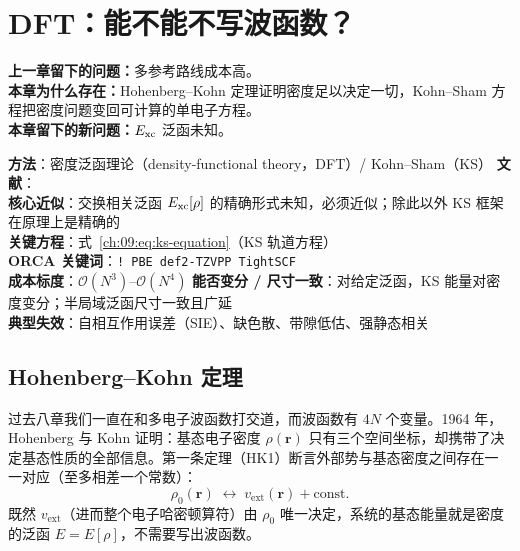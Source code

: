 
\section{DFT：能不能不写波函数？}
\label{ch:09:sec:title}

\begin{problemchain}
\textbf{上一章留下的问题：}多参考路线成本高。\\
\textbf{本章为什么存在：}Hohenberg--Kohn 定理证明密度足以决定一切，Kohn--Sham 方程把密度问题变回可计算的单电子方程。\\
\textbf{本章留下的新问题：}$E_{\mathrm{xc}}$ 泛函未知。
\end{problemchain}

\begin{methodcard}
\textbf{方法}：密度泛函理论（density-functional theory，DFT）/ Kohn--Sham（KS）\quad
\textbf{文献}：\citep{hohenberg1964,kohn1965,parr1989}\\
\textbf{核心近似}：交换相关泛函 $E_{\mathrm{xc}}[\rho]$ 的精确形式未知，必须近似；除此以外 KS 框架在原理上是精确的\\
\textbf{关键方程}：式~\eqref{ch:09:eq:ks-equation}（KS 轨道方程）\\
\textbf{ORCA 关键词}：\texttt{! PBE def2-TZVPP TightSCF}\\
\textbf{成本标度}：$\mathcal{O}(N^3)$–$\mathcal{O}(N^4)$ \quad
\textbf{能否变分 / 尺寸一致}：对给定泛函，KS 能量对密度变分；半局域泛函尺寸一致且广延\\
\textbf{典型失效}：自相互作用误差（SIE）、缺色散、带隙低估、强静态相关
\end{methodcard}

\subsection{Hohenberg--Kohn 定理}
\label{ch:09:sec:hk}

过去八章我们一直在和多电子波函数打交道，而波函数有 $4N$ 个变量。1964 年，Hohenberg 与 Kohn 证明：基态电子密度 $\rho(\mathbf{r})$ 只有三个空间坐标，却携带了决定基态性质的全部信息\citep{hohenberg1964,parr1989}。第一条定理（HK1）断言外部势与基态密度之间存在一一对应（至多相差一个常数）：
\begin{equation}
\rho_0(\mathbf{r}) \;\longleftrightarrow\; v_{\mathrm{ext}}(\mathbf{r}) + \text{const}.
\label{ch:09:eq:hk1}
\end{equation}
既然 $v_{\mathrm{ext}}$（进而整个电子哈密顿算符）由 $\rho_0$ 唯一决定，系统的基态能量就是密度的泛函 $E = E[\rho]$，不需要写出波函数。


